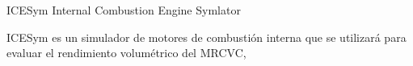 ICESym Internal Combustion Engine Symlator

ICESym es un simulador de motores de combustión interna que se utilizará para
evaluar el rendimiento volumétrico del MRCVC,
